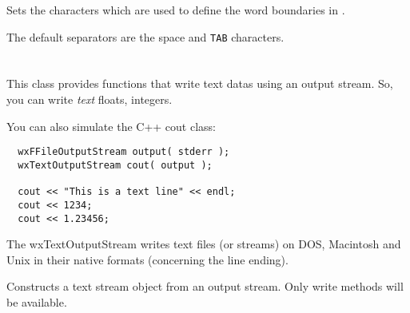 \label{wxtextinputstreamsetstringseparators}


Sets the characters which are used to define the word boundaries in 
.

The default separators are the space and {\tt TAB} characters.


\section{}\label{wxtextoutputstream}

This class provides functions that write text datas using an output stream.
So, you can write {\it text} floats, integers.

You can also simulate the C++ cout class:

\begin{verbatim}
  wxFFileOutputStream output( stderr );
  wxTextOutputStream cout( output );

  cout << "This is a text line" << endl;
  cout << 1234;
  cout << 1.23456;
\end{verbatim}

The wxTextOutputStream writes text files (or streams) on DOS, Macintosh
and Unix in their native formats (concerning the line ending).


\label{wxtextoutputstreamconstr}


Constructs a text stream object from an output stream. Only write methods will
be available.





